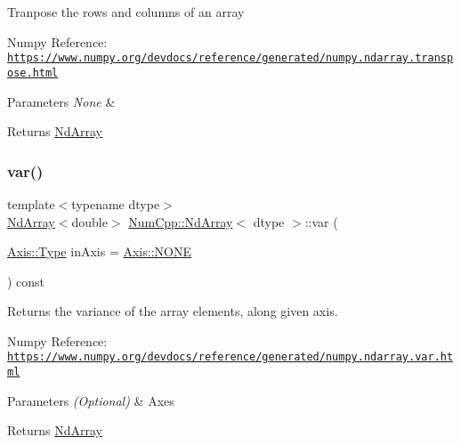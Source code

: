 Tranpose the rows and columns of an array

Numpy Reference\+: \href{https://www.numpy.org/devdocs/reference/generated/numpy.ndarray.transpose.html}{\tt https\+://www.\+numpy.\+org/devdocs/reference/generated/numpy.\+ndarray.\+transpose.\+html}


\begin{DoxyParams}{Parameters}
{\em None} & \\
\hline
\end{DoxyParams}
\begin{DoxyReturn}{Returns}
\mbox{\hyperlink{class_num_cpp_1_1_nd_array}{Nd\+Array}} 
\end{DoxyReturn}
\mbox{\label{class_num_cpp_1_1_nd_array_a5af94d5d0410ea444b669b972389374a}} 
\subsubsection{\texorpdfstring{var()}{var()}}
{\footnotesize\ttfamily template$<$typename dtype$>$ \\
\mbox{\hyperlink{class_num_cpp_1_1_nd_array}{Nd\+Array}}$<$double$>$ \mbox{\hyperlink{class_num_cpp_1_1_nd_array}{Num\+Cpp\+::\+Nd\+Array}}$<$ dtype $>$\+::var (\begin{DoxyParamCaption}\item[{\mbox{\hyperlink{struct_num_cpp_1_1_axis_ac10eb76f8631762d9ed70c40c42ca6cb}{Axis\+::\+Type}}}]{in\+Axis = {\ttfamily \mbox{\hyperlink{struct_num_cpp_1_1_axis_ac10eb76f8631762d9ed70c40c42ca6cba747ae657022cca1d87702b56d0c038e9}{Axis\+::\+N\+O\+NE}}} }\end{DoxyParamCaption}) const\hspace{0.3cm}{\ttfamily [inline]}}

Returns the variance of the array elements, along given axis.

Numpy Reference\+: \href{https://www.numpy.org/devdocs/reference/generated/numpy.ndarray.var.html}{\tt https\+://www.\+numpy.\+org/devdocs/reference/generated/numpy.\+ndarray.\+var.\+html}


\begin{DoxyParams}{Parameters}
{\em (\+Optional)} & Axes \\
\hline
\end{DoxyParams}
\begin{DoxyReturn}{Returns}
\mbox{\hyperlink{class_num_cpp_1_1_nd_array}{Nd\+Array}} 
\end{DoxyReturn}
\mbox{\label{class_num_cpp_1_1_nd_array_a6d355000bd8adc8c6811d7c5dd4b0bcd}} 
